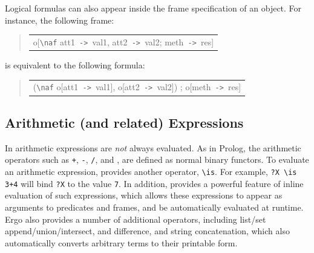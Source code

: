 \documentclass[11pt]{article}
\newcommand{\ERGO}{\mbox{\smaller{\ensuremath{\cal{E}}\smaller{{\sc{RGO}}}}}\xspace}
\newcommand{\FLSYSTEM}{\ERGO}
\newenvironment{qrules}{\begin{quote}\tt\begin{tabular}[t]{l}}%
{\end{tabular}\end{quote}}
\newcommand{\mvd}{{\mbox{\tt \,->\,}}}  %
\newcommand{\bs}{\textbackslash}
\newcommand{\RULELOGNAF}{{\texttt{{\bs}naf}}\xspace}
\begin{document}
%
Logical formulas can also appear inside the frame specification of an object. For
instance, the following frame:
\begin{qrules}
o[\RULELOGNAF att1{\mvd}val1, att2{\mvd}val2; meth{\mvd}res]
\end{qrules}
is equivalent to the following formula:
\begin{qrules}
(\RULELOGNAF o[att1{\mvd}val1], o[att2{\mvd}val2]) ; o[meth{\mvd}res]
\end{qrules}


\subsection{Arithmetic (and related) Expressions}\label{sec-arith-expr}


In \FLSYSTEM arithmetic expressions are \emph{not} always evaluated. As in
Prolog, the arithmetic operators such as {\tt +}, {\tt -}, {\tt /}, and
{\tt *}, are defined as normal binary functors. To evaluate an arithmetic
expression, \FLSYSTEM provides another operator, {\tt \bs{}is}.
For example, {\tt ?X \bs{}is 3+4} will bind {\tt ?X} to the value {\tt 7}.
In addition, \ERGO provides a powerful feature of inline evaluation
of such expressions, which allows these expressions to appear as arguments
to predicates and frames, and be automatically evaluated at runtime.
Ergo also provides a number of additional operators, including
list/set append/union/intersect, and difference, and
string concatenation, which also
automatically converts arbitrary terms to their printable form.
\end{document}

